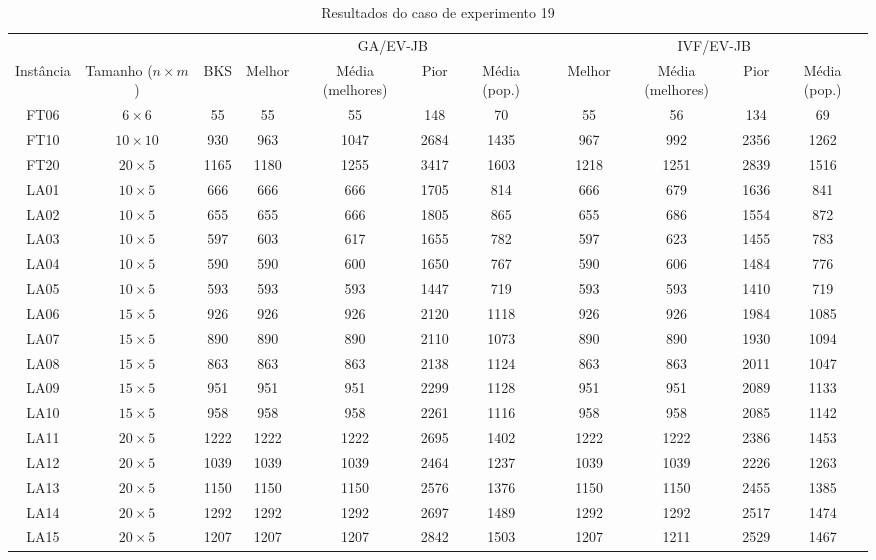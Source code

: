 \begin{sidewaystable}
\caption{Resultados do caso de experimento 19}
\centering
\label{experimento19}
\begin{tabular}{cccccccccccc}
\toprule
& & & \multicolumn{4}{c}{GA/EV-JB} & & \multicolumn{4}{c}{IVF/EV-JB} \\
\cmidrule(c){4-7}
\cmidrule(c){9-12}
Inst\^{a}ncia & Tamanho ($n \times m$) & BKS & Melhor & M\'{e}dia (melhores) & Pior & M\'{e}dia (pop.) & & Melhor & M\'{e}dia (melhores) & Pior & M\'{e}dia (pop.) \\
\midrule
FT06 & $6 \times 6$ & 55 & 55 & 55 & 148 & 70 & & 55 & 56 & 134 & 69 \\
FT10 & $10 \times 10$ & 930 & 963 & 1047 & 2684 & 1435 & & 967 & 992 & 2356 & 1262 \\
FT20 & $20 \times 5$ & 1165 & 1180 & 1255 & 3417 & 1603 & & 1218 & 1251 & 2839 & 1516 \\
LA01 & $10 \times 5$ & 666 & 666 & 666 & 1705 & 814 & & 666 & 679 & 1636 & 841 \\
LA02 & $10 \times 5$ & 655 & 655 & 666 & 1805 & 865 & & 655 & 686 & 1554 & 872 \\
LA03 & $10 \times 5$ & 597 & 603 & 617 & 1655 & 782 & & 597 & 623 & 1455 & 783 \\
LA04 & $10 \times 5$ & 590 & 590 & 600 & 1650 & 767 & & 590 & 606 & 1484 & 776 \\
LA05 & $10 \times 5$ & 593 & 593 & 593 & 1447 & 719 & & 593 & 593 & 1410 & 719 \\
LA06 & $15 \times 5$ & 926 & 926 & 926 & 2120 & 1118 & & 926 & 926 & 1984 & 1085 \\
LA07 & $15 \times 5$ & 890 & 890 & 890 & 2110 & 1073 & & 890 & 890 & 1930 & 1094 \\
LA08 & $15 \times 5$ & 863 & 863 & 863 & 2138 & 1124 & & 863 & 863 & 2011 & 1047 \\
LA09 & $15 \times 5$ & 951 & 951 & 951 & 2299 & 1128 & & 951 & 951 & 2089 & 1133 \\
LA10 & $15 \times 5$ & 958 & 958 & 958 & 2261 & 1116 & & 958 & 958 & 2085 & 1142 \\
LA11 & $20 \times 5$ & 1222 & 1222 & 1222 & 2695 & 1402 & & 1222 & 1222 & 2386 & 1453 \\
LA12 & $20 \times 5$ & 1039 & 1039 & 1039 & 2464 & 1237 & & 1039 & 1039 & 2226 & 1263 \\
LA13 & $20 \times 5$ & 1150 & 1150 & 1150 & 2576 & 1376 & & 1150 & 1150 & 2455 & 1385 \\
LA14 & $20 \times 5$ & 1292 & 1292 & 1292 & 2697 & 1489 & & 1292 & 1292 & 2517 & 1474 \\
LA15 & $20 \times 5$ & 1207 & 1207 & 1207 & 2842 & 1503 & & 1207 & 1211 & 2529 & 1467 \\
\bottomrule
\end{tabular}
\end{sidewaystable}
